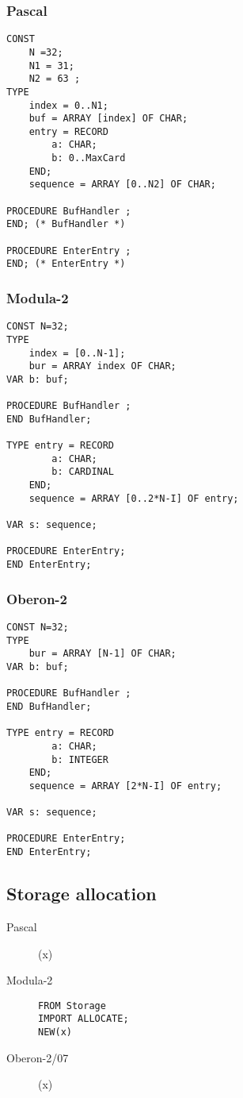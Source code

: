 \documentclass[10pt]{article}
\begin{document}
\subsubsection{Pascal}
\begin{lstlisting}[style=example]   
CONST
    N =32; 
    N1 = 31; 
    N2 = 63 ;
TYPE
    index = 0..N1; 
    buf = ARRAY [index] OF CHAR; 
    entry = RECORD
        a: CHAR;
        b: 0..MaxCard
    END; 
    sequence = ARRAY [0..N2] OF CHAR;
    
PROCEDURE BufHandler ;
END; (* BufHandler *)

PROCEDURE EnterEntry ; 
END; (* EnterEntry *)
\end{lstlisting} 

\subsubsection{Modula-2}
\begin{lstlisting}[style=example]   
CONST N=32;
TYPE
    index = [0..N-1]; 
    bur = ARRAY index OF CHAR; 
VAR b: buf;

PROCEDURE BufHandler ; 
END BufHandler;

TYPE entry = RECORD
        a: CHAR;
        b: CARDINAL
    END; 
    sequence = ARRAY [0..2*N-I] OF entry; 
    
VAR s: sequence;
    
PROCEDURE EnterEntry; 
END EnterEntry;
\end{lstlisting} 

\subsubsection{Oberon-2}
\begin{lstlisting}[style=example]   
CONST N=32;
TYPE
    bur = ARRAY [N-1] OF CHAR; 
VAR b: buf;

PROCEDURE BufHandler ; 
END BufHandler;

TYPE entry = RECORD
        a: CHAR;
        b: INTEGER
    END; 
    sequence = ARRAY [2*N-I] OF entry; 
    
VAR s: sequence;
    
PROCEDURE EnterEntry; 
END EnterEntry;
\end{lstlisting}

\subsection{Storage allocation}
\begin{description}
    \item[Pascal] \NEW(x) 
    \item[Modula-2] \lstinline!FROM Storage! \\
    \lstinline!IMPORT ALLOCATE;! \\
    \lstinline!NEW(x)!
    \item[Oberon-2/07]  \NEW(x) 
\end{description}
\end{document}
